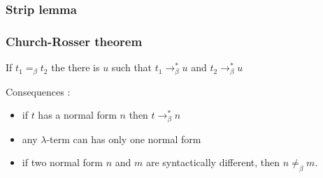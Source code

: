   \subsubsection{Strip lemma}

  \subsubsection{Church-Rosser theorem}

  If $t_1 =_\beta t_2$ the there is $u$ such that $t_1 \to_\beta^* u$ and $t_2
  \to_\beta^* u$

  Consequences :

  \begin{itemize}
    \item if $t$ has a normal form $n$ then $t \to_\beta^* n$

    \item any $\lambda$-term can has only one normal form

    \item if two normal form $n$ and $m$ are syntactically different, then $n
      \not =_\beta m$.
  \end{itemize}



